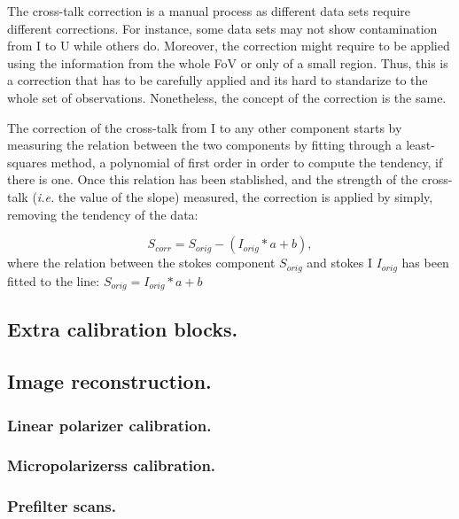 The cross-talk correction is a manual process as different data sets require different corrections. For instance, some data sets may not show contamination from I to U while others do. Moreover, the correction might require to be applied using the information from the whole FoV or only of a small region. Thus, this is a correction that has to be carefully applied and its hard to standarize to the whole set of observations. Nonetheless, the concept of the correction is the same. 

The correction of the cross-talk from I to any other component starts by measuring the relation between the two components by fitting through a least-squares method, a polynomial of first order in order to compute the tendency, if there is one. Once this relation has been stablished, and the strength of the cross-talk (\textit{i.e.} the value of the slope) measured, the correction is applied by simply, removing the tendency of the data: 

\begin{equation}
  S_{corr} = S_{orig} - (I_{orig} * a + b),
\end{equation}
where the relation between the stokes component $S_{orig}$ and stokes I $I_{orig}$ has been fitted to the line: $S_{orig} =  I_{orig} * a + b$

\subsection{Extra calibration blocks.}

\subsection{Image reconstruction.}
\subsubsection{Linear polarizer calibration.}
\subsubsection{Micropolarizerss calibration.}
\subsubsection{Prefilter scans.}

